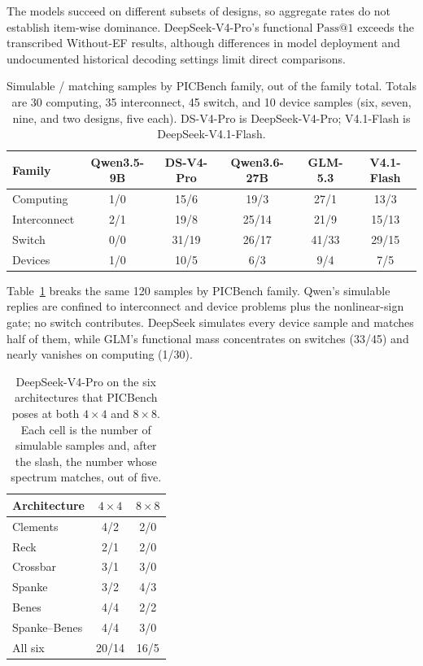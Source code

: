\documentclass[11pt]{article}
\makeatletter
\newcommand{\passk}[1]{\mathrm{Pass@}#1}
\makeatother
\begin{document}
The models succeed on different subsets of designs, so aggregate rates do not establish item-wise dominance. DeepSeek-V4-Pro's functional $\passk{1}$ exceeds the transcribed Without-EF results, although differences in model deployment and undocumented historical decoding settings limit direct comparisons.

\begin{table}[H]
\caption{Simulable / matching samples by PICBench family, out of the family total.
Totals are 30 computing, 35 interconnect, 45 switch, and 10 device samples (six, seven, nine, and two designs, five each).
DS-V4-Pro is DeepSeek-V4-Pro; V4.1-Flash is DeepSeek-V4.1-Flash.}
\label{tab:family}
\begin{center}
\begin{small}
\begin{tabular}{lccccc}
\toprule
Family & Qwen3.5-9B & DS-V4-Pro & Qwen3.6-27B & GLM-5.3 & V4.1-Flash \\
\midrule
Computing & 1/0 & 15/6 & 19/3 & 27/1 & 13/3 \\
Interconnect & 2/1 & 19/8 & 25/14 & 21/9 & 15/13 \\
Switch & 0/0 & 31/19 & 26/17 & 41/33 & 29/15 \\
Devices & 1/0 & 10/5 & 6/3 & 9/4 & 7/5 \\
\bottomrule
\end{tabular}
\end{small}
\end{center}
\end{table}

Table~\ref{tab:family} breaks the same 120 samples by PICBench family.
Qwen's simulable replies are confined to interconnect and device problems plus the nonlinear-sign gate; no switch contributes.
DeepSeek simulates every device sample and matches half of them, while GLM's functional mass concentrates on switches (33/45) and nearly vanishes on computing (1/30).

\begin{table}[H]
\caption{DeepSeek-V4-Pro on the six architectures that PICBench poses at both $4 \times 4$ and $8 \times 8$.
Each cell is the number of simulable samples and, after the slash, the number whose spectrum matches, out of five.}
\label{tab:width}
\begin{center}
\begin{small}
\begin{tabular}{lcc}
\toprule
Architecture & $4 \times 4$ & $8 \times 8$ \\
\midrule
Clements & 4/2 & 2/0 \\
Reck & 2/1 & 2/0 \\
Crossbar & 3/1 & 3/0 \\
Spanke & 3/2 & 4/3 \\
Benes & 4/4 & 2/2 \\
Spanke--Benes & 4/4 & 3/0 \\
\midrule
All six & 20/14 & 16/5 \\
\bottomrule
\end{tabular}
\end{small}
\end{center}
\end{table}
\end{document}
